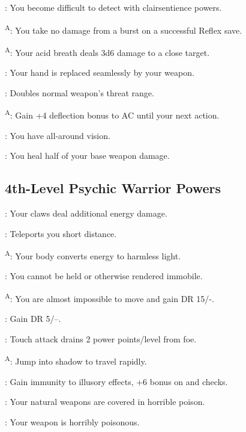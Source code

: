 : You become difficult to detect with clairsentience powers.

\textsuperscript{A}: You take no damage from a burst on a successful Reflex save.

\textsuperscript{A}: Your acid breath deals 3d6 damage to a close target.

: Your hand is replaced seamlessly by your weapon.

: Doubles normal weapon's threat range.

\textsuperscript{A}: Gain +4 deflection bonus to AC until your next action.

: You have all-around vision.

: You heal half of your base weapon damage.




\subsection{4th-Level Psychic Warrior Powers}

: Your claws deal additional energy damage.

: Teleports you short distance.

\textsuperscript{A}: Your body converts energy to harmless light.

: You cannot be held or otherwise rendered immobile.

\textsuperscript{A}: You are almost impossible to move and gain DR 15/-.

: Gain DR 5/--.

: Touch attack drains 2 power points/level from foe.

\textsuperscript{A}: Jump into shadow to travel rapidly. %

: Gain immunity to illusory effects, +6 bonus on  and  checks.

: Your natural weapons are covered in horrible poison.

: Your weapon is horribly poisonous.

